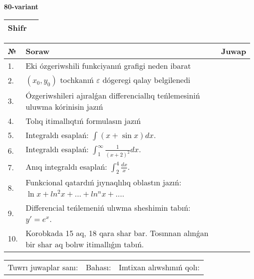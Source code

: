 \documentclass{article}
\begin{document}
  \egroup
  
  \newpage
  
  
  \textbf{80-variant}\\
  
  \bgroup
  \def\arraystretch{1.6} %
  
  \begin{tabular}{|m{5.7cm}|m{9.5cm}|}
  \hline
  Shifr & \\
  \hline
  \end{tabular}
  
  \vspace{1cm}
  
  \begin{tabular}{|m{0.7cm}|m{10cm}|m{4cm}|}
  \hline
  № & Soraw & Juwap \\
  \hline
  1. & Eki ózgeriwshili funkciyanıń grafigi neden ibarat &  \\
  \hline
  2. & \((x_0,y_0)\) tochkanıń \(\varepsilon\) dógeregi qalay belgilenedi &  \\
  \hline
  3. & Ózgeriwshileri ajıralǵan differenciallıq teńlemesiniń uluwma kórinisin jazıń &  \\
  \hline
  4. & Tolıq itimallıqtıń formulasın jazıń &  \\
  \hline
  5. & Integraldı esaplań: \(\int{(x + \sin x)dx}\). &  \\
  \hline
  6. & Integraldı esaplań: \(\int_{1}^{\infty}{\frac{1}{(x + 2)^2 }dx}\). &  \\
  \hline
  7. & Anıq integraldı esaplań: \(\int_{2}^{4}\frac{dx}{x}\). &  \\
  \hline
  8. & Funkcional qatardıń jıynaqlılıq oblastın jazıń: \(\ln x + ln^2 x + ... + ln^{n}x + ...\). &  \\
  \hline
  9. & Differencial teńlemeniń ulıwma sheshimin tabıń: \(y' = e^{x}\). &  \\
  \hline
  10. & Korobkada 15 aq, 18 qara shar bar. Tosınnan alınǵan bir shar aq bolıw itimallıǵın tabıń. &  \\
  \hline
  \end{tabular}
  
  \vspace{1cm}
  
  \begin{tabular}{lll}
  Tuwrı juwaplar sanı: \underline{\hspace{1.5cm}} & 
  Bahası: \underline{\hspace{1.5cm}} & 
  Imtixan alıwshınıń qolı: \underline{\hspace{2cm}} \\
  \end{tabular}
  
\end{document}
